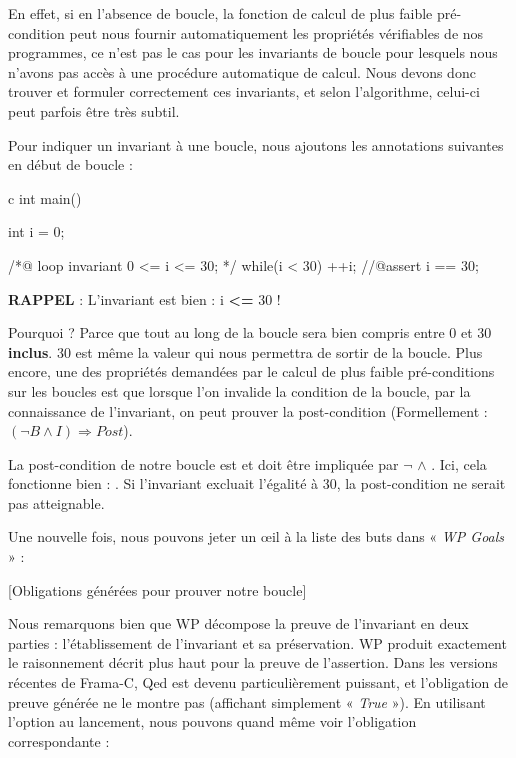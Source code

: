En effet, si en l'absence de boucle, la fonction de calcul de plus faible 
pré-condition peut nous fournir automatiquement les propriétés vérifiables de nos
programmes, ce n'est pas le cas pour les invariants de boucle pour lesquels 
nous n'avons pas accès à une procédure automatique de calcul. Nous devons donc 
trouver et formuler correctement ces invariants, et selon l'algorithme, celui-ci
peut parfois être très subtil.



Pour indiquer un invariant à une boucle, nous ajoutons les annotations suivantes
en début de boucle :



\begin{CodeBlock}{c}
int main(){
  int i = 0;
  
  /*@
    loop invariant 0 <= i <= 30;
  */
  while(i < 30){
    ++i;
  }
  //@assert i == 30;
}
\end{CodeBlock}



\begin{Warning}
\textbf{RAPPEL} : L'invariant est bien : i \textbf{<=} 30 !
\end{Warning}


Pourquoi ? Parce que tout au long de la boucle  sera bien compris entre
0 et 30 \textbf{inclus}. 30 est même la valeur qui nous permettra de sortir de la 
boucle. Plus encore, une des propriétés demandées par le calcul de plus faible
pré-conditions sur les boucles est que lorsque l'on invalide la condition de la
boucle, par la connaissance de l'invariant, on peut prouver la post-condition 
(Formellement : $(\neg B \wedge I) \Rightarrow Post$).



La post-condition de notre boucle est  et doit être impliquée par
$\neg$  $\wedge$ . Ici, cela fonctionne 
bien : . Si l'invariant excluait 
l'égalité à 30, la post-condition ne serait pas atteignable.



Une nouvelle fois, nous pouvons jeter un œil à la liste des buts dans « \textit{WP 
Goals} » :



[Obligations générées pour prouver notre boucle]


Nous remarquons bien que WP décompose la preuve de l'invariant en deux parties : 
l'établissement de l'invariant et sa préservation. WP produit exactement le 
raisonnement décrit plus haut pour la preuve de l'assertion. Dans les versions
récentes de Frama-C, Qed est devenu particulièrement puissant, et l'obligation de
preuve générée ne le montre pas (affichant simplement « \textit{True} »). En utilisant 
l'option  au lancement, nous pouvons quand même voir 
l'obligation correspondante :



